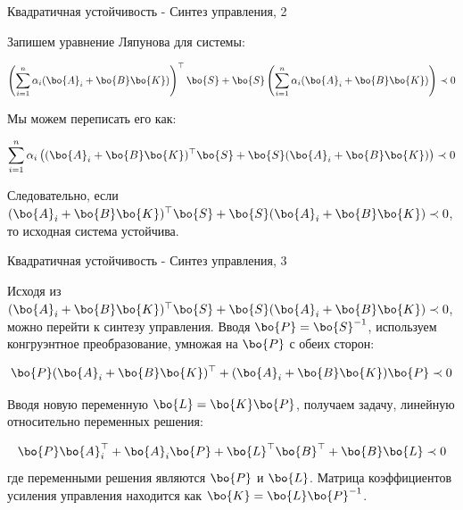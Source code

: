 \documentclass{beamer}
\begin{document}
\begin{frame}{Квадратичная устойчивость - Синтез управления, 2}
	\begin{flushleft}
		
		Запишем уравнение Ляпунова для системы:
		
		\begin{equation}
			\left(
			\sum\limits_{i=1}^{n} \alpha_i (\bo{A}_i + \bo{B}\bo{K})
			\right)^\top \bo{S} 
			+ 
			\bo{S}
			\left(
			\sum\limits_{i=1}^{n} \alpha_i (\bo{A}_i + \bo{B}\bo{K})
			\right) 
			\prec 0
		\end{equation}
		
		Мы можем переписать его как:
		
		\begin{equation}
			\sum\limits_{i=1}^{n} \alpha_i 
			\left( 
			(\bo{A}_i + \bo{B}\bo{K})^\top \bo{S} +
			\bo{S} (\bo{A}_i + \bo{B}\bo{K})
			\right)
			\prec 0
		\end{equation}
		
		Следовательно, если $(\bo{A}_i + \bo{B}\bo{K})^\top \bo{S} +
		\bo{S} (\bo{A}_i + \bo{B}\bo{K}) \prec 0$, то исходная система устойчива.
		
	\end{flushleft}
\end{frame}

\begin{frame}{Квадратичная устойчивость - Синтез управления, 3}
	\begin{flushleft}
		
		Исходя из $(\bo{A}_i + \bo{B}\bo{K})^\top \bo{S} +
		\bo{S} (\bo{A}_i + \bo{B}\bo{K}) \prec 0$, можно перейти к синтезу управления. Вводя $\bo{P} = \bo{S}^{-1}$, используем конгруэнтное преобразование, умножая на $\bo{P}$ с обеих сторон:
		
		\begin{equation}
			\bo{P}(\bo{A}_i + \bo{B}\bo{K})^\top  +
			(\bo{A}_i + \bo{B}\bo{K})\bo{P} \prec 0
		\end{equation}
		
		Вводя новую переменную $\bo{L} = \bo{K} \bo{P}$, получаем задачу, линейную относительно переменных решения:
		
		\begin{equation}
			\bo{P}\bo{A}_i^\top + \bo{A}_i \bo{P} +
			\bo{L}^\top\bo{B}^\top + \bo{B}\bo{L} \prec 0
		\end{equation}		
		где переменными решения являются $\bo{P}$ и $\bo{L}$. Матрица коэффициентов усиления управления находится как $\bo{K} = \bo{L} \bo{P}^{-1}$.
		
	\end{flushleft}
\end{frame}
\end{document}
